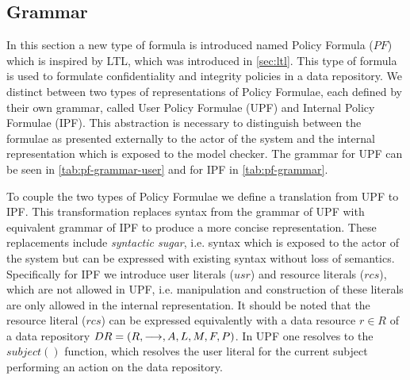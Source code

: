 \subsection{Grammar}\label{sec:grammar}
In this section a new type of formula is introduced named Policy Formula ($PF$) which is inspired by LTL, which was introduced in \autoref{sec:ltl}. This type of formula is used to formulate confidentiality and integrity policies in a data repository. We distinct between two types of representations of Policy Formulae, each defined by their own grammar, called User Policy Formulae (UPF) and Internal Policy Formulae (IPF). This abstraction is necessary to distinguish between the formulae as presented externally to the actor of the system and the internal representation which is exposed to the model checker. The grammar for UPF can be seen in \autoref{tab:pf-grammar-user} and for IPF in \autoref{tab:pf-grammar}.





To couple the two types of Policy Formulae we define a translation from UPF to IPF. This transformation replaces syntax from the grammar of UPF with equivalent grammar of IPF to produce a more concise representation. These replacements include \emph{syntactic sugar}, i.e. syntax which is exposed to the actor of the system but can be expressed with existing syntax without loss of semantics. Specifically for IPF we introduce user literals ($usr$) and resource literals ($rcs$), which are not allowed in UPF, i.e. manipulation and construction of these literals are only allowed in the internal representation. It should be noted that the resource literal ($rcs$) can be expressed equivalently with a data resource $r \in R$ of a data repository $DR= \left( R, \longrightarrow, A, L, M, F, P \right)$. In UPF one resolves to the $subject()$ function, which resolves the user literal for the current subject performing an action on the data repository.

